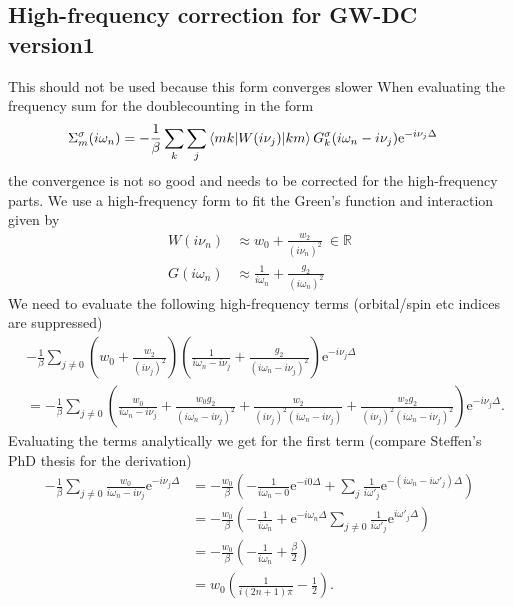 \documentclass[12pt,a4paper]{scrartcl}
\numberwithin{equation}{section}
\newcommand{\cng}[1]{{\color{red}#1}}
\begin{document}
\subsection{High-frequency correction for GW-DC version1}
\cng{This should not be used because this form converges slower}
When evaluating the frequency sum for the doublecounting in the form 
\begin{align}
  \Sigma_m^{\sigma}(i\omega_n) 
%
  &= -\frac{1}{\beta}\sum_k \sum_{j}
   \braket{m k | W(i\nu_j)|k m}G^{\sigma}_{k}(i\omega_n-i\nu_j)
   \mathrm{e}^{-i\nu_j \Delta}
\end{align}
the convergence is not so good and needs to be corrected
for the high-frequency parts.
We use a high-frequency form to fit the Green's function and interaction
given by
\begin{align}
 W(i\nu_n)    &\approx w_0 + \frac{w_2}{(i\nu_n)^2} \ \in \mathbb{R} \\
 G(i\omega_n) &\approx  \frac{1}{i\omega_n} + \frac{g_2}{(i\omega_n)^2} 
\end{align}
We need to evaluate the following high-frequency terms (orbital/spin etc indices
are suppressed)
\begin{align}
& -\frac{1}{\beta}\sum_{j\neq 0} 
  \left( w_0 + \frac{w_2}{(i\nu_j)^2} \right)
  \left( \frac{1}{i\omega_n-i\nu_j} + \frac{g_2}{(i\omega_n-i\nu_j)^2} \right)
   \mathrm{e}^{-i\nu_j \Delta} \\
% 
&= -\frac{1}{\beta} \sum_{j\neq 0}
\left( 
  \frac{w_0}{i\omega_n-i\nu_j} + \frac{w_0 g_2}{(i\omega_n-i\nu_j)^2}
+ \frac{w_2}{(i\nu_j)^2(i\omega_n-i\nu_j)} + \frac{w_2g_2}{(i\nu_j)^2(i\omega_n-i\nu_j)^2}
\right)
\mathrm{e}^{-i\nu_j \Delta}.
\end{align}
Evaluating the terms analytically we get for the first term (compare Steffen's PhD thesis
for the derivation)
\begin{align}
   -\frac{1}{\beta}\sum_{j\neq 0} \frac{w_0}{i\omega_n-i\nu_j}\mathrm{e}^{-i\nu_j \Delta}
&= -\frac{w_0}{\beta}\left(-\frac{1}{i\omega_n-0}\mathrm{e}^{-i0 \Delta} + \sum_{j} \frac{1}{i\omega'_j}\mathrm{e}^{-(i\omega_n-i\omega'_j) \Delta}\right) \\
&= -\frac{w_0}{\beta}\left( -\frac{1}{i\omega_n}
       +\mathrm{e}^{-i\omega_n \Delta} \sum_{j\neq 0} \frac{1}{i\omega'_j}\mathrm{e}^{i\omega'_j \Delta} \right) \\
&= -\frac{w_0}{\beta}
       \left(-\frac{1}{i\omega_n} +  \frac{\beta}{2}\right) \\
&= w_0 \left( \frac{1}{i(2n+1)\pi} - \frac{1}{2} \right) .
\end{align}
\end{document}
